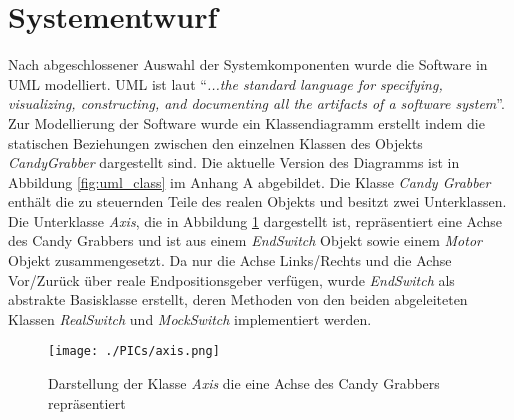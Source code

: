 \documentclass[BMR,Bachelor,ngerman]{twbook}%
\begin{document}
\section{Systementwurf}
Nach abgeschlossener Auswahl der Systemkomponenten wurde die Software in \ac{UML} modelliert. \ac{UML} ist laut  ``\emph{...the standard language for specifying, visualizing, constructing, and documenting all the artifacts of a software system}''. Zur Modellierung der Software wurde ein Klassendiagramm erstellt indem die statischen Beziehungen zwischen den einzelnen Klassen des Objekts \emph{CandyGrabber} dargestellt sind. Die aktuelle Version des Diagramms ist in Abbildung \ref{fig:uml_class} im Anhang A abgebildet. Die Klasse \emph{Candy Grabber} enthält die zu steuernden Teile des realen Objekts und besitzt zwei Unterklassen. Die Unterklasse \emph{Axis}, die in Abbildung \ref{fig:uml_axis} dargestellt ist, repräsentiert eine Achse des Candy Grabbers und ist aus einem \emph{EndSwitch} Objekt sowie einem \emph{Motor} Objekt zusammengesetzt. Da nur die Achse Links/Rechts und die Achse Vor/Zurück über reale Endpositionsgeber verfügen, wurde \emph{EndSwitch} als abstrakte Basisklasse erstellt, deren Methoden von den beiden abgeleiteten Klassen \emph{RealSwitch} und \emph{MockSwitch} implementiert werden. 
%
\begin{figure}[!htbp]
\centering
\texttt{[image: ./PICs/axis.png]}
\caption{Darstellung der Klasse \emph{Axis} die eine Achse des Candy Grabbers repräsentiert}\label{fig:uml_axis}
\end{figure}
%
\\\newline
\end{document}
